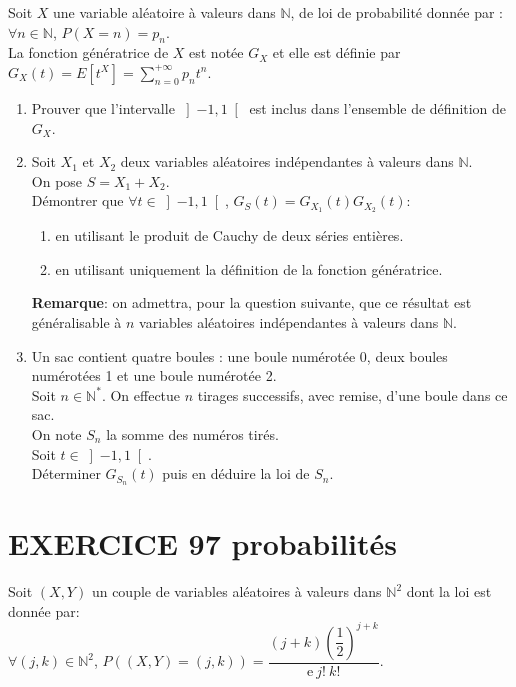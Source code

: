\documentclass[10pt,oneside]{article}
\begin{document}
\begin{flushleft}
Soit $X$ une variable aléatoire à valeurs dans $\mathbb{N}$, de loi de probabilité donnée par : $\forall n\in \mathbb{N}$, $P(X=n)=p_n$.\\
  La fonction génératrice de $X$ est notée $G_X$ et elle est définie par $G_X(t)=E[t^X]=\displaystyle \sum_{n=0}^{+\infty}p_nt^n$.
  \begin{enumerate}
  \item
  Prouver que l'intervalle $\left] -1,1\right[ $ est inclus dans l'ensemble de définition de $G_X$.
\item
Soit $X_1$ et $X_2$ deux variables aléatoires indépendantes à valeurs dans $\mathbb{N}$.\\
On pose $S=X_1+X_2$.\\
Démontrer  que  $\forall t\in \left]-1,1 \right[ $, $G_S(t)=G_{X_1} (t)G_{X_2}(t)$:\\
\begin{enumerate}
\item
en utilisant le produit de Cauchy de deux séries entières.
\item
en utilisant uniquement la définition de la fonction génératrice.
\end{enumerate}

\textbf{Remarque}: on admettra, pour la question suivante,  que ce résultat est généralisable à $n$ variables aléatoires indépendantes à valeurs dans $\mathbb{N}$.
\item
Un sac contient quatre boules : une boule numérotée 0, deux boules numérotées 1 et une boule numérotée 2.\\
Soit $n\in\mathbb{N}^{*}$.
On effectue $n$ tirages  successifs, avec remise, d'une boule dans ce sac.\\
On note $S_n$ la somme des numéros tirés.\\
Soit $t\in \left]-1,1 \right[ $. \\
Déterminer $G_{S_n}(t)$ puis  en  déduire la loi de $S_n$.
  \end{enumerate}


\section*{EXERCICE 97 \:probabilités}


 Soit $(X,Y)$ un couple de variables aléatoires à valeurs dans $\mathbb{N}^2$ dont la loi est donnée par:\\
$\forall (j,k)\in {\mathbb{N}^2}$, 
$P\left( (X,Y)=(j,k)\right)=\dfrac{(j+k)\left( \dfrac{1}{2}\right) ^{j+k}}{\mathrm{e}\:j!\:k!}$.
\begin{enumerate}


\end{enumerate}
\end{flushleft}
\end{document}

